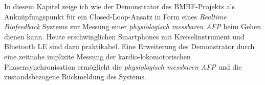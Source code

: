 \label{sec:zussemfassung}

In diesem Kapitel zeige ich wie der Demonstrator des \acs{BMBF}-Projekts als Anknüpfungspunkt für ein Closed-Loop-Ansatz in Form eines \emph{Realtime Biofeedback} Systems zur Messung einer \emph{physiologisch messbaren \ac{AFP}} beim Gehen dienen kann. Heute erschwinglichen Smartphones mit Kreiselinstrument und Bluetooth LE sind dazu praktikabel. Eine Erweiterung des Demonstrator durch eine zeitnahe implizite Messung der kardio-lokomotorischen Phasensynchronisation ermöglicht die \emph{physiologisch messbaren \ac{AFP}} und die zustandsbezogene Rückmeldung des Systems.

